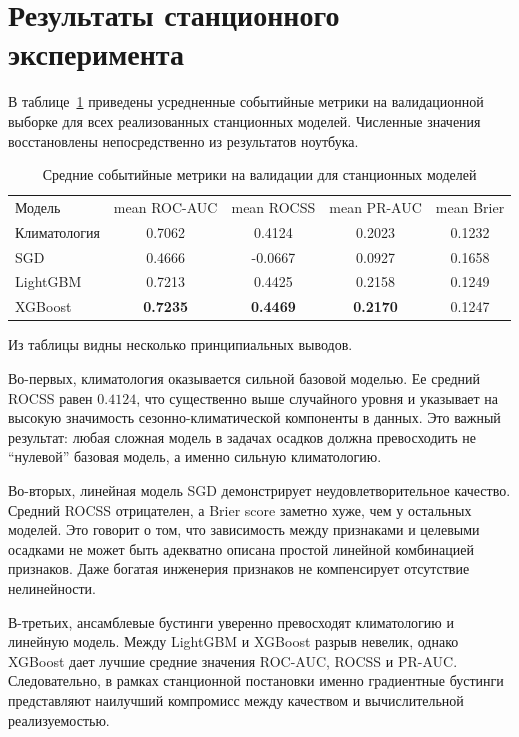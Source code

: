 \section{Результаты станционного эксперимента}

В таблице~\ref{tab:station-mean} приведены усредненные событийные метрики на валидационной выборке для всех реализованных станционных моделей. Численные значения восстановлены непосредственно из результатов ноутбука.

\begin{table}[H]
\centering
\begin{tabular}{lcccc}
Модель & mean ROC-AUC & mean ROCSS & mean PR-AUC & mean Brier \\
Климатология & 0.7062 & 0.4124 & 0.2023 & 0.1232 \\
SGD & 0.4666 & -0.0667 & 0.0927 & 0.1658 \\
LightGBM & 0.7213 & 0.4425 & 0.2158 & 0.1249 \\
XGBoost & \textbf{0.7235} & \textbf{0.4469} & \textbf{0.2170} & 0.1247 \\
\end{tabular}
\caption{Средние событийные метрики на валидации для станционных моделей}
\label{tab:station-mean}
\end{table}

Из таблицы видны несколько принципиальных выводов.

Во-первых, климатология оказывается сильной базовой моделью. Ее средний ROCSS равен \(0.4124\), что существенно выше случайного уровня и указывает на высокую значимость сезонно-климатической компоненты в данных. Это важный результат: любая сложная модель в задачах осадков должна превосходить не \enquote{нулевой} базовая модель, а именно сильную климатологию.

Во-вторых, линейная модель SGD демонстрирует неудовлетворительное качество. Средний ROCSS отрицателен, а Brier score заметно хуже, чем у остальных моделей. Это говорит о том, что зависимость между признаками и целевыми осадками не может быть адекватно описана простой линейной комбинацией признаков. Даже богатая инженерия признаков не компенсирует отсутствие нелинейности.

В-третьих, ансамблевые бустинги уверенно превосходят климатологию и линейную модель. Между LightGBM и XGBoost разрыв невелик, однако XGBoost дает лучшие средние значения ROC-AUC, ROCSS и PR-AUC. Следовательно, в рамках станционной постановки именно градиентные бустинги представляют наилучший компромисс между качеством и вычислительной реализуемостью.

